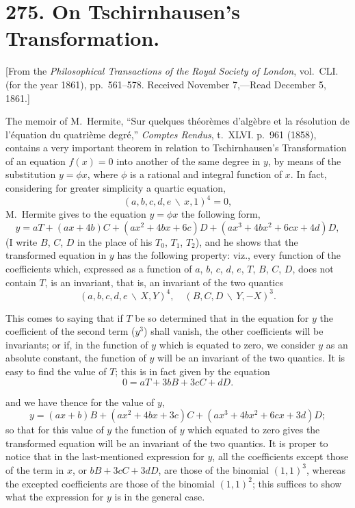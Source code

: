 \documentclass[11pt,a4paper]{book}
\begin{document}
\section*{275. On Tschirnhausen's Transformation.}

[From the \textit{Philosophical Transactions of the Royal Society of London},
vol.~CLI. (for the year 1861), pp.~561--578.
Received November 7,---Read December 5, 1861.]
\vspace{0.5em}

The memoir of M.~Hermite, ``Sur quelques th\'{e}or\`{e}mes d'alg\`{e}bre et la r\'{e}solution
de l'\'{e}quation du quatri\`{e}me degr\'{e},'' \textit{Comptes Rendus}, t.~XLVI. p.~961 (1858),
contains a very important theorem in relation to Tschirnhausen's Transformation of an
equation $f(x)=0$ into another of the same degree in $y$, by means of the substitution
$y = \phi x$, where $\phi$ is a rational and integral function of $x$. In fact, considering
for greater simplicity a quartic equation,
\[(a,b,c,d,e\,\backslash\!\!\,x,1)^{4} = 0,\]
M.~Hermite gives to the equation $y = \phi x$ the following form,
\[y = aT + (ax+4b)C + (ax^{2}+4bx+6c)D + (ax^{3}+4bx^{2}+6cx+4d)D,\]
(I write $B$, $C$, $D$ in the place of his $T_{0}$, $T_{1}$, $T_{2}$), and he shows that the
transformed equation in $y$ has the following property: viz., every function of the
coefficients which, expressed as a function of $a$, $b$, $c$, $d$, $e$, $T$, $B$, $C$, $D$,
does not contain $T$, is an invariant, that is, an invariant of the two quantics
\[(a,b,c,d,e\,\backslash\!\!\,X,Y)^{4}, \quad (B,C,D\,\backslash\!\!\,Y,-X)^{3}.\]

This comes to saying that if $T$ be so determined that in the equation for $y$ the
coefficient of the second term ($y^{3}$) shall vanish, the other coefficients will be
invariants; or if, in the function of $y$ which is equated to zero, we consider $y$ as an
absolute constant, the function of $y$ will be an invariant of the two quantics. It is
easy to find the value of $T$; this is in fact given by the equation
\[0 = aT + 3bB + 3cC + dD.\]

\newpage

and we have thence for the value of $y$,
\[y = (ax+b)B + (ax^{2}+4bx+3c)C + (ax^{3}+4bx^{2}+6cx+3d)D;\]
so that for this value of $y$ the function of $y$ which equated to zero gives the
transformed equation will be an invariant of the two quantics. It is proper to notice
that in the last-mentioned expression for $y$, all the coefficients except those of the
term in $x$, or $bB+3cC+3dD$, are those of the binomial $(1,1)^{3}$, whereas the excepted
coefficients are those of the binomial $(1,1)^{2}$; this suffices to show what the
expression for $y$ is in the general case.
\end{document}
